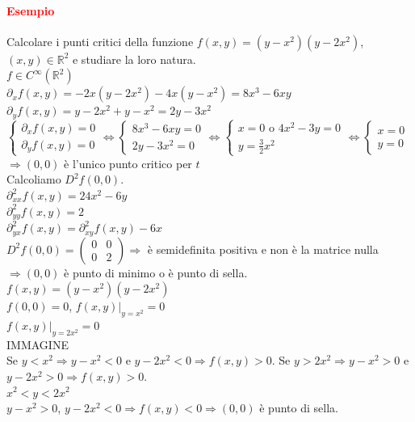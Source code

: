 \documentclass{article}
\newcommand{\R}{\mathbb{R}}
\begin{document}
\paragraph{\textcolor{red}{Esempio}}
Calcolare i punti critici della funzione $f(x,y)=(y-x^2)(y-2x^2)$, $(x,y) \in \R^2$ e studiare la loro natura.\\
$f\in C^\infty (\R^2)$\\
$\partial_xf(x,y)=-2x(y-2x^2)-4x(y-x^2)=8x^3-6xy$\\
$\partial_yf(x,y)=y-2x^2+y-x^2=2y-3x^2$\\
$\begin{cases}
    \partial_xf(x,y)=0\\
    \partial_yf(x,y)=0
\end{cases} \Leftrightarrow \begin{cases}
    8x^3-6xy=0\\
    2y-3x^2=0
\end{cases} \Leftrightarrow \begin{cases}
    x=0 \text{   o   } 4x^2-3y=0\\
    y=\frac{3}{2}x^2
\end{cases}\Leftrightarrow \begin{cases}
    x=0\\
    y=0
\end{cases}$\\
$\Rightarrow(0,0)$ è l'unico punto critico per $t$\\
Calcoliamo $D^2f(0,0)$.\\
$\partial_{xx}^2f(x,y)=24x^2-6y$\\
$\partial_{yy}^2f(x,y)=2$\\
$\partial_{yx}^2f(x,y)=\partial_{xy}^2f(x,y)-6x$\\
$D^2f(0,0)=\begin{pmatrix}
    0&0\\
    0&2
\end{pmatrix} \Rightarrow$ è semidefinita positiva e non è la matrice nulla $\Rightarrow (0,0)$ è punto di minimo o è punto di sella.\\
$f(x,y)=(y-x^2)(y-2x^2)$\\
$f(0,0)=0$, $f(x,y) |_{y=x^2}=0$\\
$f(x,y)|_{y=2x^2}=0$\\
IMMAGINE\\
Se $y < x^2 \Rightarrow y-x^2 < 0$ e $y-2x^2< 0 \Rightarrow f(x,y)>0$. Se $y > 2x^2 \Rightarrow y-x^2 >0$ e $y-2x^2 >0 \Rightarrow f(x,y)> 0$.\\
$x^2< y< 2x^2$\\
$y- x^2>0$, $y-2x^2< 0 \Rightarrow f(x,y)<0 \Rightarrow (0,0)$ è punto di sella.
\end{document}
